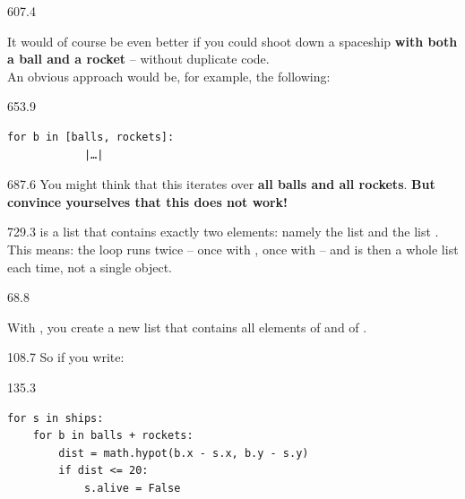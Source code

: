 \documentclass{aslab}
\begin{document}
\begin{region}[pitch=13.25]{607.4}
\begin{ntasks}[start=3]
\item It would of course be even better if you could shoot down a spaceship
  \textbf{with both a ball and a rocket} -- without duplicate code.\\
  An obvious approach would be, for example, the following:
\end{ntasks}
\end{region}

\begin{region}[x=74.7,right=0,pitch=13.2]{653.9}
\begin{lstlisting}[style=py]
      for b in [balls, rockets]:
            |…|
\end{lstlisting}
\end{region}

\begin{region}[x=74.7,right=0,pitch=14.3]{687.6}
You might think that this iterates over \textbf{all balls and all rockets}.
\textbf{But convince yourselves that this does not work!}
\end{region}

\begin{region}[x=74.7,right=0,pitch=13.5]{729.3}
 is a list that contains exactly two elements: namely
the list  and the list . This means: the loop runs
twice -- once with , once with  -- and
 is then a whole list each time, not a single object.
\end{region}

\nextpage
\begin{region}[pitch=13.5]{68.8}
\begin{ntasks}[start=4]
\item With , you create a new list that contains all
  elements of  and of .
\end{ntasks}
\end{region}

\begin{region}[x=74.7,right=0]{108.7}
So if you write:
\end{region}

\begin{region}[x=74.7,right=0,pitch=13.2]{135.3}
\begin{lstlisting}[style=py]
for s in ships:
    for b in balls + rockets:
        dist = math.hypot(b.x - s.x, b.y - s.y)
        if dist <= 20:
            s.alive = False
\end{lstlisting}
\end{region}
\end{document}
